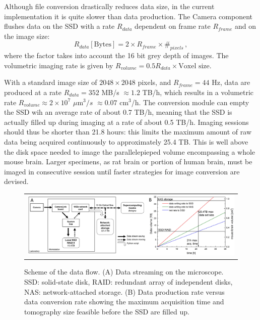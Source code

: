 \documentclass[12pt]{spieman}  %
\begin{document}
Although file conversion drastically reduces data size, in the current implementation it is quite slower than data production. The Camera component flushes data on the SSD with a rate $R_{data}$ dependent on frame rate $R_{frame}$ and on the image size:
\begin{equation}
R_{data} [\text{Bytes}] = 2\times R_{frame} \times \#_{pixels}\,,
\end{equation}
where the factor takes into account the 16 bit grey depth of images. The volumetric imaging rate is given by $R_{volume} = 0.5 R_{data} \times \text{Voxel size}$.

With a standard image size of $2048\times 2048$ pixels, and $R_{frame}=44$ Hz, data are produced at a rate $R_{data}=352$ MB/s $\approx 1.2$ TB/h, which results in a volumetric rate $R_{volume} \approx 2\times 10^7$ $\mu\text{m}^3/s$ $\approx 0.07$ $\text{cm}^3$/h. The conversion module can empty the SSD wih an average rate of about 0.7 TB/h, meaning that the SSD is actually filled up during imaging at a rate of about 0.5 TB/h. Imaging sessions should thus be shorter than 21.8 hours: this limits the maximum amount of raw data being acquired continuously to approximately 25.4 TB. This is well above the disk space needed to image the parallelepieped volume encompassing a whole mouse brain. Larger specimens, as rat brain or portion of human brain, must be imaged in consecutive session until faster strategies for image conversion are devised.

	\begin{figure}
   \begin{center}
   \begin{tabular}{c}
   \includegraphics[width=\textwidth]{DataFlow.eps}
   \end{tabular}
   \end{center}
   \caption{\label{fig:DataFlow} Scheme of the data flow. (A) Data streaming on the microscope. SSD: solid-state disk, RAID: redundant array of independent disks, NAS: network-attached storage. (B) Data production rate versus data conversion rate showing the maximum acquisition time and tomography size feasible before the SSD are filled up.} 
   \end{figure}
	
\end{document}

